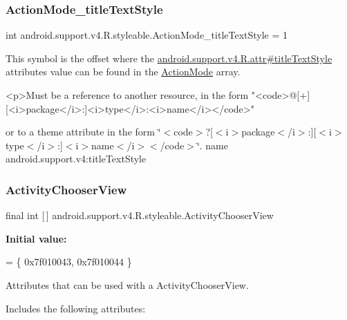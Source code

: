 \subsubsection{\texorpdfstring{Action\+Mode\+\_\+title\+Text\+Style}{ActionMode\_titleTextStyle}}
{\footnotesize\ttfamily int android.\+support.\+v4.\+R.\+styleable.\+Action\+Mode\+\_\+title\+Text\+Style = 1\hspace{0.3cm}{\ttfamily [static]}}

This symbol is the offset where the \hyperlink{classandroid_1_1support_1_1v4_1_1R_1_1attr_a504cda790d3f21fe9a084bf909d83e9a}{android.\+support.\+v4.\+R.\+attr\#title\+Text\+Style} attribute\textquotesingle{}s value can be found in the \hyperlink{classandroid_1_1support_1_1v4_1_1R_1_1styleable_abc7d063172fa73270c0ab8e5f7093972}{Action\+Mode} array.

\begin{DoxyVerb}      <p>Must be a reference to another resource, in the form "<code>@[+][<i>package</i>:]<i>type</i>:<i>name</i></code>"
\end{DoxyVerb}
 or to a theme attribute in the form \char`\"{}$<$code$>$?\mbox{[}$<$i$>$package$<$/i$>$\+:\mbox{]}\mbox{[}$<$i$>$type$<$/i$>$\+:\mbox{]}$<$i$>$name$<$/i$>$$<$/code$>$\char`\"{}.  name android.\+support.\+v4\+:title\+Text\+Style \mbox{\label{classandroid_1_1support_1_1v4_1_1R_1_1styleable_ab8c1a7f930b02f15ae84e9f2d388782a}} 
\subsubsection{\texorpdfstring{Activity\+Chooser\+View}{ActivityChooserView}}
{\footnotesize\ttfamily final int \mbox{[}$\,$\mbox{]} android.\+support.\+v4.\+R.\+styleable.\+Activity\+Chooser\+View\hspace{0.3cm}{\ttfamily [static]}}

{\bfseries Initial value\+:}
\begin{DoxyCode}
= \{
            0x7f010043, 0x7f010044
        \}
\end{DoxyCode}
Attributes that can be used with a Activity\+Chooser\+View. 

Includes the following attributes\+:

